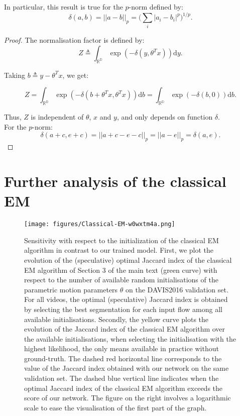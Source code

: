 \documentclass[10pt,twocolumn,letterpaper]{article}
\begin{document}
\vspace{0.5cm}
\noindent In particular, this result is true for the $p$-norm defined by: $$\delta(a, b) = ||a-b||_p = \big(\sum_i |a_i-b_i|^p\big)^{1/p}.$$

\begin{proof} 
The normalisation factor is defined by: $$Z \triangleq \int_\mathbb{R^D} \exp(-\delta(y, \theta^Tx))\mathrm{d}y.$$

Taking $b \triangleq y - \theta^Tx$, we get:

$$Z = \int_\mathbb{R^D} \exp(-\delta(b+\theta^Tx, \theta^Tx))\mathrm{d}b = \int_{\mathbb{R^D}} \exp(-\delta(b,0))\mathrm{d}b.$$

Thus, $Z$ is independent of $\theta$, $x$ and $y$, and only depends on function $\delta$. \\

For the $p$-norm: $$\delta(a+c, e+c) = ||a+c -e -c||_p = ||a - e||_p = \delta(a,e).$$
\end{proof}


\section{Further analysis of the classical EM}
\label{classicEM}

\begin{figure}[t!]
\texttt{[image: figures/Classical-EM-w0wxtm4a.png]}
\caption{Sensitivity with respect to the initialization of the classical EM algorithm in contrast to our trained model. First, we plot the evolution of the (speculative) optimal Jaccard index of the classical EM algorithm of Section 3 of the main text (green curve) with respect to the number of available random initialisations of the parametric motion parameters $\theta$ on the DAVIS2016 validation set. For all videos, the optimal (speculative) Jaccard index is obtained by selecting the best segmentation for each input flow among all available initialisations. Secondly, the yellow curve plots the evolution of the Jaccard index of the classical EM algorithm over the available initialisations, when selecting the initialisation with the highest likelihood, the only means available in practice without ground-truth. The dashed red horizontal line corresponds to the value of the Jaccard index obtained with our network on the same validation set. The dashed blue vertical line indicates when the optimal Jaccard index of the classical EM algorithm exceeds the score of our network. The figure on the right involves a logarithmic scale to ease the visualisation of the first part of the graph.}
\label{fig:classical_EM}
\vspace{-0.2cm}
\end{figure}
\end{document}
